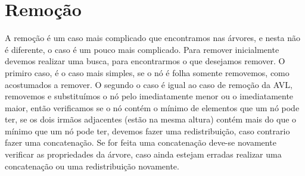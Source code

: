 \documentclass[report]{uftex}
\begin{document}
\section{Remoção}
\label{sec:remoção}

\noindent A remoção é um caso mais complicado que encontramos nas árvores, e nesta não é diferente, o caso é um pouco mais complicado. Para remover inicialmente devemos realizar uma busca, para encontrarmos o que desejamos remover. O primiro caso, é o caso mais simples, se o nó é folha somente removemos, como acostumados a remover. O segundo o caso é igual ao caso de remoção da AVL, removemos e substituímos o nó pelo imediatamente menor ou o imediatamente maior, então verificamos se o nó contém o mínimo de elementos que um nó pode ter, se os dois irmãos adjacentes (estão na mesma altura) contém mais do que o mínimo que um nó pode ter, devemos  fazer uma redistribuição, caso contrario fazer uma concatenação. Se for feita uma concatenação deve-se novamente verificar as propriedades da árvore, caso ainda estejam erradas realizar uma concatenação ou uma redistribuição novamente.\\
\end{document}
